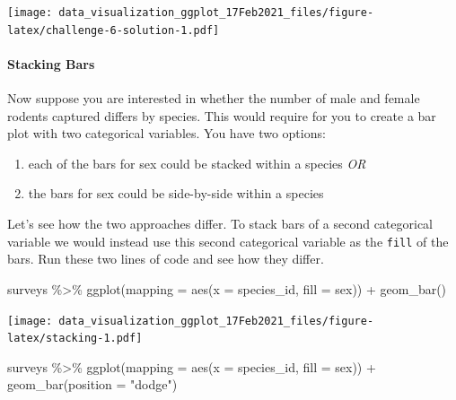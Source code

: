 \documentclass[
]{article}
\newenvironment{Shaded}{\begin{snugshade}}{\end{snugshade}}
\newcommand{\AttributeTok}[1]{\textcolor[rgb]{0.77,0.63,0.00}{#1}}
\newcommand{\FunctionTok}[1]{\textcolor[rgb]{0.00,0.00,0.00}{#1}}
\newcommand{\NormalTok}[1]{#1}
\newcommand{\SpecialCharTok}[1]{\textcolor[rgb]{0.00,0.00,0.00}{#1}}
\newcommand{\StringTok}[1]{\textcolor[rgb]{0.31,0.60,0.02}{#1}}
\providecommand{\tightlist}{%
  \setlength{\itemsep}{0pt}\setlength{\parskip}{0pt}}
\begin{document}
\texttt{[image: data\_visualization\_ggplot\_17Feb2021\_files/figure-latex/challenge-6-solution-1.pdf]}

\newpage

\hypertarget{stacking-bars}{%
\paragraph{Stacking Bars}\label{stacking-bars}}

Now suppose you are interested in whether the number of male and female
rodents captured differs by species. This would require for you to
create a bar plot with two categorical variables. You have two options:

\begin{enumerate}
\def\labelenumi{\arabic{enumi}.}
\tightlist
\item
  each of the bars for sex could be stacked within a species \emph{OR}
\item
  the bars for sex could be side-by-side within a species
\end{enumerate}

Let's see how the two approaches differ. To stack bars of a second
categorical variable we would instead use this second categorical
variable as the \texttt{fill} of the bars. Run these two lines of code
and see how they differ.

\begin{Shaded}
\begin{Highlighting}[]
\NormalTok{surveys }\SpecialCharTok{\%\textgreater{}\%} 
  \FunctionTok{ggplot}\NormalTok{(}\AttributeTok{mapping =} \FunctionTok{aes}\NormalTok{(}\AttributeTok{x =}\NormalTok{ species\_id, }\AttributeTok{fill =}\NormalTok{ sex)) }\SpecialCharTok{+} 
  \FunctionTok{geom\_bar}\NormalTok{()}
\end{Highlighting}
\end{Shaded}

\texttt{[image: data\_visualization\_ggplot\_17Feb2021\_files/figure-latex/stacking-1.pdf]}

\begin{Shaded}
\begin{Highlighting}[]
\NormalTok{surveys }\SpecialCharTok{\%\textgreater{}\%} 
  \FunctionTok{ggplot}\NormalTok{(}\AttributeTok{mapping =} \FunctionTok{aes}\NormalTok{(}\AttributeTok{x =}\NormalTok{ species\_id, }\AttributeTok{fill =}\NormalTok{ sex)) }\SpecialCharTok{+} 
  \FunctionTok{geom\_bar}\NormalTok{(}\AttributeTok{position =} \StringTok{"dodge"}\NormalTok{)}
\end{Highlighting}
\end{Shaded}
\end{document}
